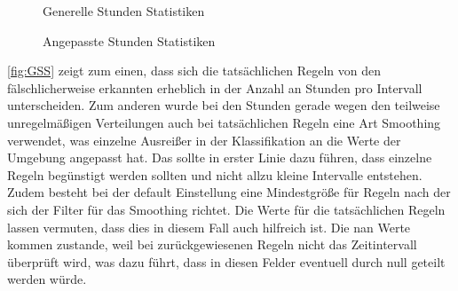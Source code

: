 \begin{figure}[!ht]
	\caption{Generelle Stunden Statistiken}
	\hspace*{\fill}%
		\hfill
	\hspace*{\fill}%
	\label{fig:GSS}

	\bigskip

	\caption{Angepasste Stunden Statistiken}
	\hspace*{\fill}%
		\hfill
	\hspace*{\fill}%
	\label{fig:GS}
\end{figure}
\autoref{fig:GSS} zeigt zum einen, dass sich die tatsächlichen Regeln von den fälschlicherweise erkannten erheblich in der Anzahl an Stunden pro Intervall unterscheiden. Zum anderen wurde bei den Stunden gerade wegen den teilweise unregelmäßigen Verteilungen auch bei tatsächlichen Regeln eine Art Smoothing verwendet, was einzelne Ausreißer in der Klassifikation an die Werte der Umgebung angepasst hat. Das sollte in erster Linie dazu führen, dass einzelne Regeln begünstigt werden sollten und nicht allzu kleine Intervalle entstehen. Zudem besteht bei der default Einstellung eine Mindestgröße für Regeln nach der sich der Filter für das Smoothing richtet. Die Werte für die tatsächlichen Regeln lassen vermuten, dass dies in diesem Fall auch hilfreich ist. Die nan Werte kommen zustande, weil bei zurückgewiesenen Regeln nicht das Zeitintervall überprüft wird, was dazu führt, dass in diesen Felder eventuell durch null geteilt werden würde.\\
